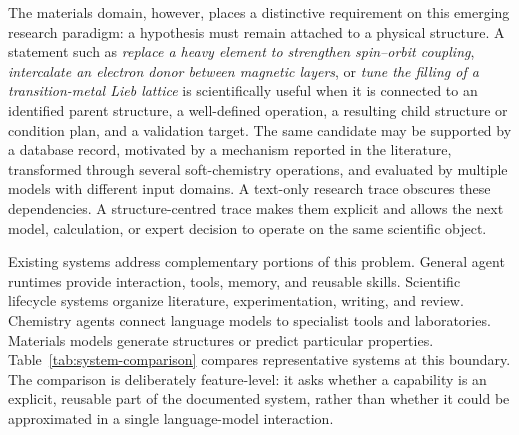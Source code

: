 \documentclass[11pt]{article}
\begin{document}
The materials domain, however, places a distinctive requirement on this emerging research paradigm: a hypothesis must remain attached to a physical structure. A statement such as \emph{replace a heavy element to strengthen spin--orbit coupling}, \emph{intercalate an electron donor between magnetic layers}, or \emph{tune the filling of a transition-metal Lieb lattice} is scientifically useful when it is connected to an identified parent structure, a well-defined operation, a resulting child structure or condition plan, and a validation target. The same candidate may be supported by a database record, motivated by a mechanism reported in the literature, transformed through several soft-chemistry operations, and evaluated by multiple models with different input domains. A text-only research trace obscures these dependencies. A structure-centred trace makes them explicit and allows the next model, calculation, or expert decision to operate on the same scientific object.

Existing systems address complementary portions of this problem. General agent runtimes provide interaction, tools, memory, and reusable skills. Scientific lifecycle systems organize literature, experimentation, writing, and review. Chemistry agents connect language models to specialist tools and laboratories. Materials models generate structures or predict particular properties. Table~\ref{tab:system-comparison} compares representative systems at this boundary. The comparison is deliberately feature-level: it asks whether a capability is an explicit, reusable part of the documented system, rather than whether it could be approximated in a single language-model interaction.
\end{document}

